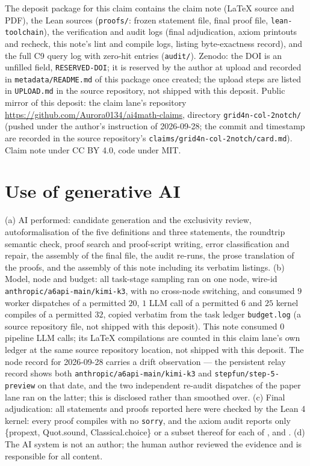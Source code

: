 \documentclass[11pt]{article}
\theoremstyle{definition}
\begin{document}
The deposit package for this claim contains the claim note (LaTeX source and
PDF), the Lean sources (\texttt{proofs/}: frozen statement file, final proof
file, \texttt{lean-toolchain}), the verification and audit logs (final
adjudication, axiom printouts and recheck, this note's lint and compile logs,
listing byte-exactness record), and the full C9 query log with zero-hit entries
(\texttt{audit/}). Zenodo: the DOI is an unfilled field, \texttt{RESERVED-DOI};
it is reserved by the author at upload and recorded in
\texttt{metadata/README.md} of this package once created; the upload steps are
listed in \texttt{UPLOAD.md} in the source repository, not shipped with this
deposit. Public mirror of this deposit: the claim lane's repository
\url{https://github.com/Aurora0134/ai4math-claims}, directory
\texttt{grid4n-col-2notch/} (pushed under the author's instruction of
2026-09-28; the commit and timestamp are recorded in the source repository's
\texttt{claims/grid4n-col-2notch/card.md}). Claim note under CC BY 4.0, code
under MIT.

\section*{Use of generative AI}

(a) AI performed: candidate generation and the exclusivity review,
autoformalisation of the five definitions and three statements, the roundtrip
semantic check, proof search and proof-script writing, error classification and
repair, the assembly of the final file, the audit re-runs, the prose
translation of the proofs, and the assembly of this note including its verbatim
listings. (b) Model, node and budget: all task-stage sampling ran on one node,
wire-id \texttt{anthropic/a6api-main/kimi-k3}, with no cross-node switching, and
consumed $9$ worker dispatches of a permitted $20$, $1$ LLM call of a permitted
$6$ and $25$ kernel compiles of a permitted $32$, copied verbatim from the task
ledger \texttt{budget.log} (a source repository file, not shipped with this
deposit). This note consumed $0$ pipeline LLM calls; its LaTeX compilations are
counted in this claim lane's own ledger at the same source repository location,
not shipped with this deposit. The node record for 2026-09-28 carries a drift
observation --- the persistent relay record shows both
\texttt{anthropic/a6api-main/kimi-k3} and \texttt{stepfun/step-5-preview} on
that date, and the two independent re-audit dispatches of the paper lane ran on
the latter; this is disclosed rather than smoothed over. (c) Final adjudication:
all statements and proofs reported here were checked by the Lean 4 kernel: every
proof compiles with no \texttt{sorry}, and the axiom audit reports only
\{propext, Quot.sound, Classical.choice\} or a subset thereof for each of
,  and .
(d) The AI system is not an author; the human author reviewed the evidence and
is responsible for all content.
\end{document}
